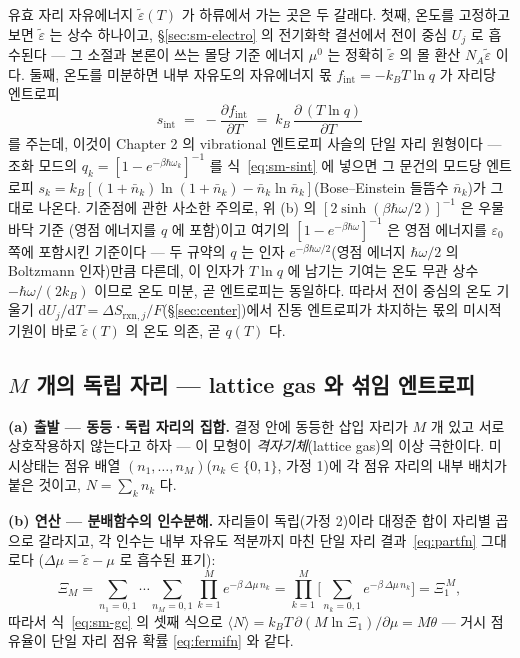 \documentclass[11pt,a4paper]{article}
\newcommand{\dd}{\mathrm{d}}
\newcommand{\rxn}{\mathrm{rxn}}
\begin{document}
유효 자리 자유에너지 $\tilde\varepsilon(T)$ 가 하류에서 가는 곳은 두 갈래다. 첫째, 온도를 고정하고 보면
$\tilde\varepsilon$ 는 상수 하나이고, \S\ref{sec:sm-electro} 의 전기화학 결선에서 전이 중심 $U_j$ 로
흡수된다 --- 그 소절과 본론이 쓰는 몰당 기준 에너지 $\mu^0$ 는 정확히 $\tilde\varepsilon$ 의 몰 환산
$N_A\tilde\varepsilon$ 이다. 둘째, 온도를 미분하면 내부 자유도의 자유에너지 몫
$f_\mathrm{int}=-k_BT\ln q$ 가 자리당 엔트로피
\begin{equation}
s_\mathrm{int}\;=\;-\frac{\partial f_\mathrm{int}}{\partial T}
\;=\;k_B\,\frac{\partial\,(T\ln q)}{\partial T}
\label{eq:sm-sint}
\end{equation}
를 주는데, 이것이 Chapter 2 의 vibrational 엔트로피 사슬의 단일 자리 원형이다 --- 조화 모드의
$q_k=[1-e^{-\beta\hbar\omega_k}]^{-1}$ 를 식~\eqref{eq:sm-sint} 에 넣으면 그 문건의 모드당 엔트로피
$s_k=k_B[(1+\bar n_k)\ln(1+\bar n_k)-\bar n_k\ln\bar n_k]$(Bose--Einstein 들뜸수 $\bar n_k$)가 그대로
나온다. 기준점에 관한 사소한 주의로, 위 (b) 의 $[2\sinh(\beta\hbar\omega/2)]^{-1}$ 은 우물 바닥 기준
(영점 에너지를 $q$ 에 포함)이고 여기의 $[1-e^{-\beta\hbar\omega}]^{-1}$ 은 영점 에너지를
$\varepsilon_0$ 쪽에 포함시킨 기준이다 --- 두 규약의 $q$ 는 인자 $e^{-\beta\hbar\omega/2}$(영점 에너지
$\hbar\omega/2$ 의 Boltzmann 인자)만큼 다른데, 이 인자가 $T\ln q$ 에 남기는 기여는 온도 무관 상수
$-\hbar\omega/(2k_B)$ 이므로 온도 미분, 곧 엔트로피는 동일하다. 따라서 전이 중심의 온도 기울기
$\dd U_j/\dd T=\Delta S_{\rxn,j}/F$(\S\ref{sec:center})에서 진동
엔트로피가 차지하는 몫의 미시적 기원이 바로 $\tilde\varepsilon(T)$ 의 온도 의존, 곧 $q(T)$ 다.

\subsection{$M$ 개의 독립 자리 --- lattice gas 와 섞임 엔트로피}\label{sec:sm-lattice}
\textbf{(a) 출발 --- 동등·독립 자리의 집합.} 결정 안에 동등한 삽입 자리가 $M$ 개 있고 서로 상호작용하지
않는다고 하자 --- 이 모형이 \emph{격자기체}(lattice gas)의 이상 극한이다. 미시상태는 점유 배열
$(n_1,\dots,n_M)$($n_k\in\{0,1\}$, 가정 1)에 각 점유 자리의 내부 배치가 붙은 것이고, $N=\sum_kn_k$ 다.

\textbf{(b) 연산 --- 분배함수의 인수분해.} 자리들이 독립(가정 2)이라 대정준 합이 자리별 곱으로 갈라지고,
각 인수는 내부 자유도 적분까지 마친 단일 자리 결과~\eqref{eq:partfn} 그대로다
($\Delta\mu=\tilde\varepsilon-\mu$ 로 흡수된 표기):
\begin{equation}
\Xi_M=\sum_{n_1=0,1}\!\cdots\!\sum_{n_M=0,1}\prod_{k=1}^{M}e^{-\beta\,\Delta\mu\,n_k}
=\prod_{k=1}^{M}\Big[\sum_{n_k=0,1}e^{-\beta\,\Delta\mu\,n_k}\Big]=\Xi_1^{\,M},
\label{eq:sm-factor}
\end{equation}
따라서 식~\eqref{eq:sm-gc} 의 셋째 식으로 $\langle N\rangle=k_BT\,\partial(M\ln\Xi_1)/\partial\mu=M\theta$ ---
거시 점유율이 단일 자리 점유 확률 \eqref{eq:fermifn} 와 같다.
\end{document}
